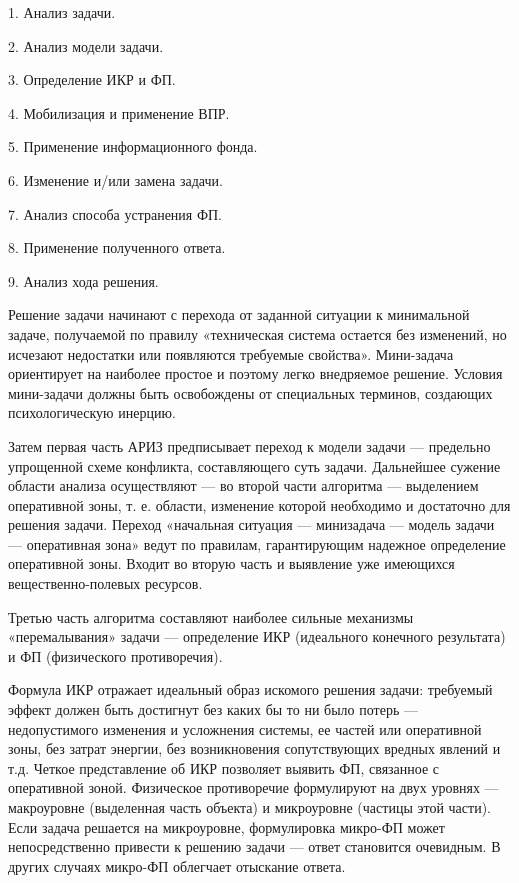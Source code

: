 1. Анализ задачи.

2. Анализ модели задачи.

3. Определение ИКР и ФП.

4. Мобилизация и применение ВПР.

5. Применение информационного фонда.

6. Изменение и/или замена задачи.

7. Анализ способа устранения ФП.

8. Применение полученного ответа.

9. Анализ хода решения.

Решение задачи начинают с перехода  от заданной ситуации к минимальной
задаче,  получаемой  по  правилу  «техническая  система  остается  без
изменений, но исчезают недостатки  или появляются требуемые свойства».
Мини-задача ориентирует на наиболее простое и поэтому легко внедряемое
решение. Условия  мини-задачи должны  быть освобождены  от специальных
терминов, создающих психологическую инерцию.

Затем  первая  часть  АРИЗ  предписывает переход  к  модели  задачи  —
предельно  упрощенной  схеме  конфликта,  составляющего  суть  задачи.
Дальнейшее  сужение области  анализа  осуществляют —  во второй  части
алгоритма  — выделением  оперативной  зоны, т.  е. области,  изменение
которой необходимо и достаточно для решения задачи. Переход «начальная
ситуация  —  минизадача —  модель  задачи  — оперативная  зона»  ведут
по  правилам,  гарантирующим  надежное определение  оперативной  зоны.
Входит во  вторую часть и выявление  уже имеющихся вещественно-полевых
ресурсов.

Третью   часть  алгоритма   составляют   наиболее  сильные   механизмы
«перемалывания»  задачи   —  определение  ИКР   (идеального  конечного
результата) и ФП (физического противоречия).

Формула  ИКР   отражает  идеальный  образ  искомого   решения  задачи:
требуемый  эффект  должен быть  достигнут  без  каких  бы то  ни  было
потерь — недопустимого  изменения и усложнения системы,  ее частей или
оперативной зоны, без затрат  энергии, без возникновения сопутствующих
вредных  явлений   и  т.д.  Четкое  представление   об  ИКР  позволяет
выявить  ФП, связанное  с оперативной  зоной. Физическое  противоречие
формулируют на двух уровнях — макроуровне (выделенная часть объекта) и
микроуровне (частицы этой части). Если задача решается на микроуровне,
формулировка микро-ФП может непосредственно  привести к решению задачи
—  ответ становится  очевидным.  В других  случаях микро-ФП  облегчает
отыскание ответа.

